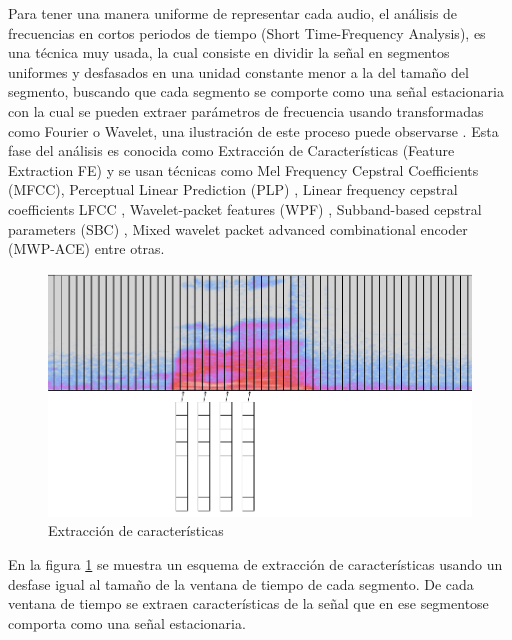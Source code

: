 Para tener una manera uniforme de representar cada audio, el análisis de frecuencias en cortos periodos de tiempo (Short Time-Frequency Analysis), es una técnica muy usada, la cual consiste en dividir la señal en segmentos uniformes y desfasados en una unidad constante menor a la del tamaño del segmento, buscando que cada segmento se comporte como una señal estacionaria con la cual se pueden extraer parámetros de frecuencia usando transformadas como Fourier o Wavelet, una ilustración de este proceso puede observarse . Esta fase del análisis es conocida como Extracción de Características (Feature Extraction FE) y se usan técnicas como Mel Frequency Cepstral Coefficients (MFCC)\cite{Davis1980ComparisonSentences}, Perceptual Linear Prediction (PLP) \cite{Hermansky1990PerceptualSpeech}, Linear frequency cepstral coefficients LFCC \cite{Davis1980ComparisonSentences}, Wavelet-packet features (WPF) \cite{Farooq2001MelRecognition}, Subband-based cepstral parameters (SBC) \cite{Sarikaya98waveletpacket}, Mixed wavelet packet advanced combinational encoder (MWP-ACE) \cite{NogueiraWaveletImplants} entre otras.

\begin{figure}[H]

\centering
\caption{Extracción de características}
\label{img:fe}
\includegraphics[scale=0.50]{images/fe.png}
\end{figure}

En la figura \ref{img:fe} se muestra un esquema de extracción de características usando un desfase igual al tamaño de la ventana de tiempo de cada segmento. De cada ventana de tiempo se extraen características de la señal que en ese segmentose comporta como una señal estacionaria.

